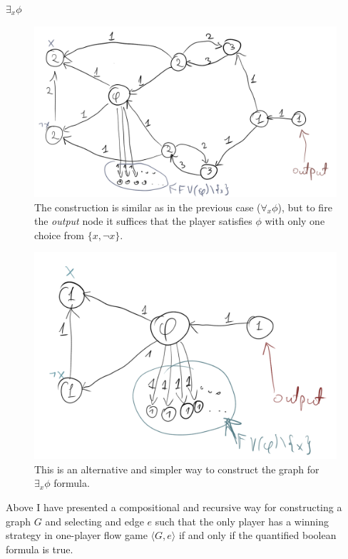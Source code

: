 \noindent
\underline{$\exists_{x} \phi$}
\begin{figure}[H]
      \centering
      \caption{
            The construction is similar as in the previous case ($\forall_{x} \phi$), but to fire the \textit{output}
            node it suffices that the player satisfies $\phi$ with only one choice from $\{x, \lnot x\}$.
      }
      \includegraphics[scale=0.2]{content/graphics/game13.png}
\end{figure}
\begin{figure}[H]
      \centering
      \caption{
            This is an alternative and simpler way to construct the graph for $\exists_{x} \phi$ formula.
      }
      \includegraphics[scale=0.2]{content/graphics/game14.png}
\end{figure}

\noindent
Above I have presented a compositional and recursive way for constructing a graph $G$ and selecting and edge $e$ such that
the only player has a winning strategy in one-player flow game $\langle G, e \rangle$ if and only if the quantified boolean
formula is true.